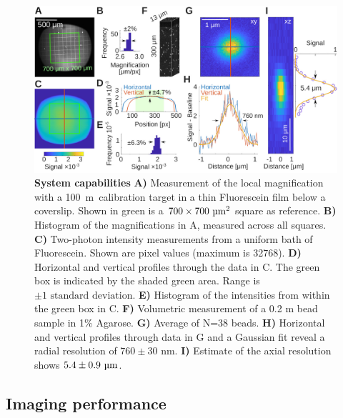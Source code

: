 \documentclass[10pt,letterpaper]{article}
\newcommand{\microns}{~\textmu m~} %
\begin{document}
%
\begin{figure}[t]
    \includegraphics[width=\textwidth]{fig5.jpg}
    \caption{{\bf System capabilities} \textbf{A)} Measurement of the local magnification with a 100\microns calibration target in a thin Fluorescein film below a coverslip. Shown in green is a $700\times700\text{ \textmu m}^2$ square as reference. \textbf{B)} Histogram of the magnifications in A, measured across all squares. \textbf{C)} Two-photon intensity measurements from a uniform bath of Fluorescein. Shown are pixel values (maximum is 32768). \textbf{D)} Horizontal and vertical profiles through the data in C. The green box is indicated by the shaded green area. Range is $\pm 1 \text{ standard deviation}$. \textbf{E)} Histogram of the intensities from within the green box in C. \textbf{F)} Volumetric measurement of a 0.2 \textmu m bead sample in 1\% Agarose. \textbf{G)} Average of N=38 beads. \textbf{H)} Horizontal and vertical profiles through data in G and a Gaussian fit reveal a radial resolution of $760\pm30\text{ nm}$. \textbf{I)} Estimate of the axial resolution shows $5.4\pm0.9\text{ \textmu m}$.}
    \label{fig5}
\end{figure}
%
%
\subsection*{Imaging performance}
\end{document}
